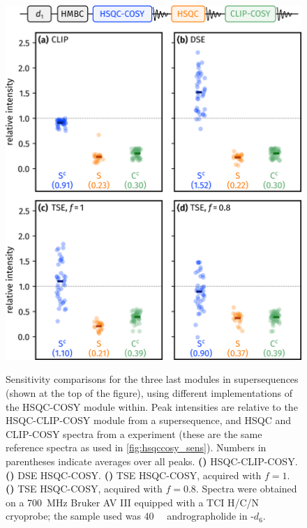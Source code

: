 \documentclass[a4paper,12pt]{article}
\newcommand{\andro}{Spectra were obtained on a \SI{700}{\MHz} Bruker AV III equipped with a TCI H/C/N cryoprobe; the sample used was \SI{40}{\milli\molar} andrographolide in \ch{DMSO}-$d_6$.}
\begin{document}
\begin{refsection}
\begin{figure}[!ht]
    \centering
    \includegraphics[]{hsqccosy_sens_with_hmbc.png}%
    {\label{fig:hsqccosy_sens_with_hmbc_clip}}%
    {\label{fig:hsqccosy_sens_with_hmbc_dse}}%
    {\label{fig:hsqccosy_sens_with_hmbc_tse_1}}%
    {\label{fig:hsqccosy_sens_with_hmbc_tse_0p8}}%
    \caption[Sensitivity comparisons for  supersequences]{
        Sensitivity comparisons for the three last modules in  supersequences (shown at the top of the figure), using different implementations of the HSQC-COSY module within.
        Peak intensities are relative to the HSQC-CLIP-COSY module from a  supersequence, and HSQC and CLIP-COSY spectra from a  experiment (these are the same reference spectra as used in \cref{fig:hsqccosy_sens}).
        Numbers in parentheses indicate averages over all peaks.
        \textbf{()} HSQC-CLIP-COSY.
        \textbf{()} DSE HSQC-COSY.
        \textbf{()} TSE HSQC-COSY, acquired with $f = 1$.
        \textbf{()} TSE HSQC-COSY, acquired with $f = 0.8$.
        \andro{}
    }
    \label{fig:hsqccosy_sens_with_hmbc}
\end{figure}


\end{refsection}
\end{document}
